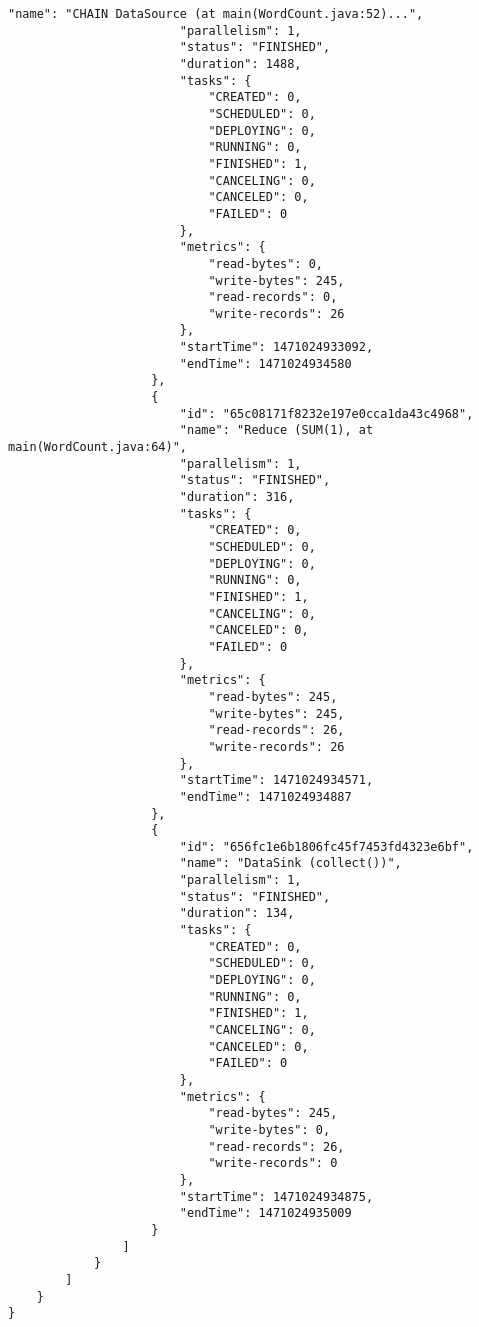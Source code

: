 \begin{lstlisting}[caption={"FlinkRestCollector" JSON result, abbreviated}, captionpos=b, label={lst:json-flink-rest}]
                        "name": "CHAIN DataSource (at main(WordCount.java:52)...",
                        "parallelism": 1,
                        "status": "FINISHED",
                        "duration": 1488,
                        "tasks": {
                            "CREATED": 0,
                            "SCHEDULED": 0,
                            "DEPLOYING": 0,
                            "RUNNING": 0,
                            "FINISHED": 1,
                            "CANCELING": 0,
                            "CANCELED": 0,
                            "FAILED": 0
                        },
                        "metrics": {
                            "read-bytes": 0,
                            "write-bytes": 245,
                            "read-records": 0,
                            "write-records": 26
                        },
                        "startTime": 1471024933092,
                        "endTime": 1471024934580
                    },
                    {
                        "id": "65c08171f8232e197e0cca1da43c4968",
                        "name": "Reduce (SUM(1), at main(WordCount.java:64)",
                        "parallelism": 1,
                        "status": "FINISHED",
                        "duration": 316,
                        "tasks": {
                            "CREATED": 0,
                            "SCHEDULED": 0,
                            "DEPLOYING": 0,
                            "RUNNING": 0,
                            "FINISHED": 1,
                            "CANCELING": 0,
                            "CANCELED": 0,
                            "FAILED": 0
                        },
                        "metrics": {
                            "read-bytes": 245,
                            "write-bytes": 245,
                            "read-records": 26,
                            "write-records": 26
                        },
                        "startTime": 1471024934571,
                        "endTime": 1471024934887
                    },
                    {
                        "id": "656fc1e6b1806fc45f7453fd4323e6bf",
                        "name": "DataSink (collect())",
                        "parallelism": 1,
                        "status": "FINISHED",
                        "duration": 134,
                        "tasks": {
                            "CREATED": 0,
                            "SCHEDULED": 0,
                            "DEPLOYING": 0,
                            "RUNNING": 0,
                            "FINISHED": 1,
                            "CANCELING": 0,
                            "CANCELED": 0,
                            "FAILED": 0
                        },
                        "metrics": {
                            "read-bytes": 245,
                            "write-bytes": 0,
                            "read-records": 26,
                            "write-records": 0
                        },
                        "startTime": 1471024934875,
                        "endTime": 1471024935009
                    }
                ]
            }
        ]
    }
}
\end{lstlisting}

